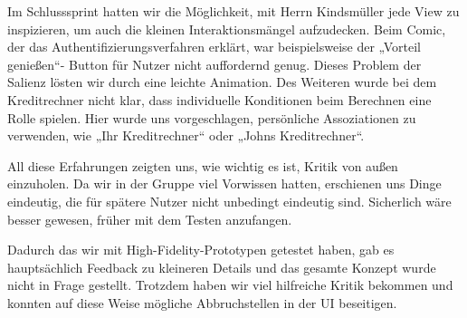 	Im Schlusssprint hatten wir die Möglichkeit, mit Herrn Kindsmüller jede View zu inspizieren, um auch die kleinen Interaktionsmängel aufzudecken. Beim Comic, der das Authentifizierungsverfahren erklärt, war beispielsweise der „Vorteil genießen“- Button für Nutzer nicht auffordernd genug. Dieses Problem der Salienz lösten wir durch eine leichte Animation. Des Weiteren wurde bei dem Kreditrechner nicht klar, dass individuelle Konditionen beim Berechnen eine Rolle spielen. Hier wurde uns vorgeschlagen, persönliche Assoziationen zu verwenden, wie „Ihr  Kreditrechner“ oder „Johns Kreditrechner“.

	All diese Erfahrungen zeigten uns, wie wichtig es ist, Kritik von außen einzuholen. Da wir in der Gruppe viel Vorwissen hatten, erschienen uns Dinge eindeutig, die für spätere Nutzer nicht unbedingt eindeutig sind.
Sicherlich wäre besser gewesen, früher mit dem Testen anzufangen.

	Dadurch das wir mit High-Fidelity-Prototypen getestet haben, gab es hauptsächlich Feedback zu kleineren Details und das gesamte Konzept wurde nicht in Frage gestellt. Trotzdem haben wir viel hilfreiche Kritik bekommen und konnten auf diese Weise mögliche Abbruchstellen in der UI beseitigen.
